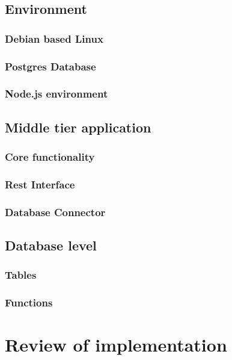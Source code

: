 \subsection{Environment}

\subsubsection{Debian based Linux}

\subsubsection{Postgres Database}

\subsubsection{Node.js environment}


\subsection{Middle tier application}

\subsubsection{Core functionality}

\subsubsection{Rest Interface}

\subsubsection{Database Connector}


\subsection{Database level}

\subsubsection{Tables}

\subsubsection{Functions}


\section{Review of implementation}